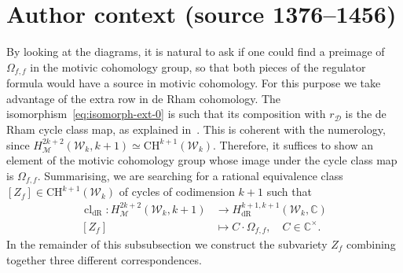 \documentclass[10pt,a4paper]{amsart}
\newcommand{\KS}{\mathscr{W}}
\newcommand{\regulator}[1]{r_{#1}}
\newcommand{\C}{\numberset{C}}
\newcommand{\CH}{\mathrm{CH}}
\DeclareMathOperator{\cl}{cl}
\DeclareMathOperator{\dR}{dR}
\newcommand{\del}{\mathcal{D}}
\DeclareMathOperator{\mot}{\mathscr{M}}
\newcommand{\rD}{\regulator{\del}}
\newcommand{\numberset}{\mathbb}
\begin{document}
\section*{Author context (source 1376--1456)}
By looking at the diagrams, it is natural to ask if one could find a preimage of $\Omega_{f,f}$ in the motivic cohomology group, so that both pieces of the regulator formula would have a source in motivic cohomology. For this purpose we take advantage of the extra row in de Rham cohomology. The isomorphism~\eqref{eq:isomorph-ext-0} is such that its composition with $\rD$ is the de Rham cycle class map, as explained in~\cite[§7]{esnaultviehweg}. This is coherent with the numerology, since $H^{2k+2}_{\mot}(\KS_k,k+1) \simeq \CH^{k+1}(\KS_k)$. Therefore, it suffices to show an element of the motivic cohomology group whose image under the cycle class map is $\Omega_{f,f}$. Summarising, we are searching for a rational equivalence class $[Z_f]\in\CH^{k+1}(\KS_k)$ of cycles of codimension $k+1$ such that
\begin{align*}
    \cl_{\dR} \colon H_{\mot}^{2k+2}(\KS_k,k+1) &\to H^{k+1,k+1}_{\dR}(\KS_k,\C) \\
    [Z_f] &\mapsto C\cdot \Omega_{f,f}, \quad C \in \C^{\times}.
\end{align*}
In the remainder of this subsubsection we construct the subvariety $Z_f$ combining together three different correspondences.
\end{document}
